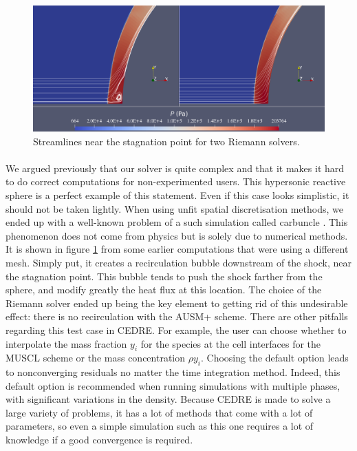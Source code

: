         \begin{figure}
          \centering
          \includegraphics[width=\textwidth]{figures/sphere_carbuncle.png}
          \caption{Streamlines near the stagnation point for two Riemann solvers.}
          \label{fig:sphere_carbuncle}
        \end{figure}

        \paragraph{}
        We argued previously that our solver is quite complex and that it makes it hard to do correct computations for non-experimented users.
        This hypersonic reactive sphere is a perfect example of this statement.
        Even if this case looks simplistic, it should not be taken lightly.
        When using unfit spatial discretisation methods, we ended up with a well-known problem of a such simulation called carbuncle \cite{MacCormack2013}.
        This phenomenon does not come from physics but is solely due to numerical methods.
        It is shown in figure \ref{fig:sphere_carbuncle} from some earlier computations that were using a different mesh.
        Simply put, it creates a recirculation bubble downstream of the shock, near the stagnation point.
        This bubble tends to push the shock farther from the sphere, and modify greatly the heat flux at this location.
        The choice of the Riemann solver ended up being the key element to getting rid of this undesirable effect: there is no recirculation with the AUSM+ scheme.
        There are other pitfalls regarding this test case in CEDRE.
        For example, the user can choose whether to interpolate the mass fraction $y_i$ for the species at the cell interfaces for the MUSCL scheme or the mass concentration $\rho y_i$.
        Choosing the default option leads to nonconverging residuals no matter the time integration method.
        Indeed, this default option is recommended when running simulations with multiple phases, with significant variations in the density.
        Because CEDRE is made to solve a large variety of problems, it has a lot of methods that come with a lot of parameters, so even a simple simulation such as this one requires a lot of knowledge if a good convergence is required.

